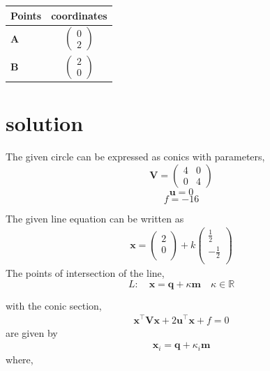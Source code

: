 \documentclass[journal,12pt,twocolumn]{IEEEtran}
\let\vec\mathbf
\newcommand{\myvec}[1]{\ensuremath{\begin{pmatrix}#1\end{pmatrix}}}
\begin{document}
\begin{table}[h!]
\begin{center}
\setlength{\arrayrulewidth}{0.5mm}
\renewcommand{\arraystretch}{1.5}
    \begin{tabular}{|l|c|}
    \hline 
    \textbf{Points} & \textbf{coordinates} \\ \hline
   $\vec{A}$ & $\myvec{
   0\\
   2
   } $ \\\hline
   $\vec{B}$ & $\myvec{
   2\\
   0
   } $ \\\hline
      \end{tabular}
  \end{center}
\end{table}
\newpage
\section{solution}
The given circle can be expressed as conics with parameters,
\begin{equation}
\vec{V}=\myvec{
4 & 0\\
0 & 4
}
\end{equation}
\begin{equation}
\vec{u}=0 
\end{equation}
\begin{equation}
f=-16
\end{equation}

The given line equation can be written as\\ 
\begin{align} 
	\vec{x}=\begin{pmatrix}2 \\ 0 \\ \end{pmatrix}+k\begin{pmatrix}\frac{1}{2} \\ -\frac{1}{2} \\ \end{pmatrix}
\end{align}
The points of intersection of the line, \\ 
\begin{equation}
L: \quad \vec{x} = \vec{q} + \kappa \vec{m} \quad \kappa \in \mathbb{R}
\end{equation}

with the conic section, \\ 
\begin{align}
	\vec{x}^{\top}\vec{V}\vec{x} + 2\vec{u}^{\top} \vec{x} + f = 0
\end{align}
are given by \\
\begin{align}
\vec{x}_i = \vec{q} + \kappa_i \vec{m}
\end{align}
where, \\
\end{document}
